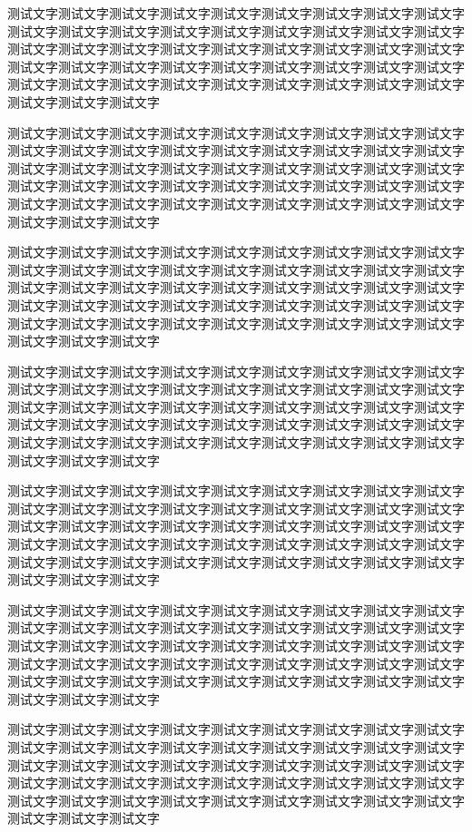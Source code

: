\begin{Project}
\begin{QuestionItem}[2]
	\item 测试文字测试文字测试文字测试文字测试文字测试文字测试文字测试文字测试文字测试文字测试文字测试文字测试文字测试文字测试文字测试文字测试文字测试文字测试文字测试文字测试文字测试文字测试文字测试文字测试文字测试文字测试文字测试文字测试文字测试文字测试文字测试文字测试文字测试文字测试文字测试文字测试文字测试文字测试文字测试文字测试文字测试文字测试文字测试文字测试文字测试文字测试文字测试文字
	\item 测试文字测试文字测试文字测试文字测试文字测试文字测试文字测试文字测试文字测试文字测试文字测试文字测试文字测试文字测试文字测试文字测试文字测试文字测试文字测试文字测试文字测试文字测试文字测试文字测试文字测试文字测试文字测试文字测试文字测试文字测试文字测试文字测试文字测试文字测试文字测试文字测试文字测试文字测试文字测试文字测试文字测试文字测试文字测试文字测试文字测试文字测试文字测试文字
	\item 测试文字测试文字测试文字测试文字测试文字测试文字测试文字测试文字测试文字测试文字测试文字测试文字测试文字测试文字测试文字测试文字测试文字测试文字测试文字测试文字测试文字测试文字测试文字测试文字测试文字测试文字测试文字测试文字测试文字测试文字测试文字测试文字测试文字测试文字测试文字测试文字测试文字测试文字测试文字测试文字测试文字测试文字测试文字测试文字测试文字测试文字测试文字测试文字
	\item 测试文字测试文字测试文字测试文字测试文字测试文字测试文字测试文字测试文字测试文字测试文字测试文字测试文字测试文字测试文字测试文字测试文字测试文字测试文字测试文字测试文字测试文字测试文字测试文字测试文字测试文字测试文字测试文字测试文字测试文字测试文字测试文字测试文字测试文字测试文字测试文字测试文字测试文字测试文字测试文字测试文字测试文字测试文字测试文字测试文字测试文字测试文字测试文字
	\item 测试文字测试文字测试文字测试文字测试文字测试文字测试文字测试文字测试文字测试文字测试文字测试文字测试文字测试文字测试文字测试文字测试文字测试文字测试文字测试文字测试文字测试文字测试文字测试文字测试文字测试文字测试文字测试文字测试文字测试文字测试文字测试文字测试文字测试文字测试文字测试文字测试文字测试文字测试文字测试文字测试文字测试文字测试文字测试文字测试文字测试文字测试文字测试文字
	\item 测试文字测试文字测试文字测试文字测试文字测试文字测试文字测试文字测试文字测试文字测试文字测试文字测试文字测试文字测试文字测试文字测试文字测试文字测试文字测试文字测试文字测试文字测试文字测试文字测试文字测试文字测试文字测试文字测试文字测试文字测试文字测试文字测试文字测试文字测试文字测试文字测试文字测试文字测试文字测试文字测试文字测试文字测试文字测试文字测试文字测试文字测试文字测试文字
	\item 测试文字测试文字测试文字测试文字测试文字测试文字测试文字测试文字测试文字测试文字测试文字测试文字测试文字测试文字测试文字测试文字测试文字测试文字测试文字测试文字测试文字测试文字测试文字测试文字测试文字测试文字测试文字测试文字测试文字测试文字测试文字测试文字测试文字测试文字测试文字测试文字测试文字测试文字测试文字测试文字测试文字测试文字测试文字测试文字测试文字测试文字测试文字测试文字

\end{QuestionItem}
\end{Project}
